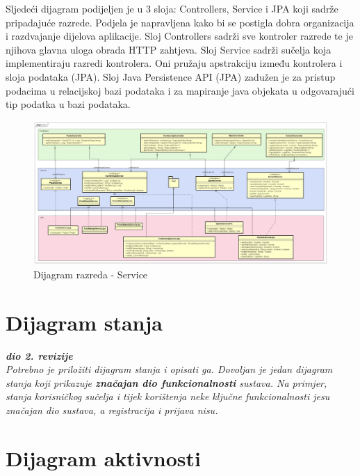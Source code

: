 		\newpage
		Sljedeći dijagram podijeljen je u 3 sloja: Controllers, Service i JPA koji sadrže pripadajuće razrede. Podjela je napravljena kako bi se postigla dobra organizacija i razdvajanje dijelova aplikacije. Sloj Controllers sadrži sve kontroler razrede te je njihova glavna uloga obrada HTTP zahtjeva. Sloj Service sadrži sučelja koja implementiraju razredi kontrolera. Oni pružaju apstrakciju između kontrolera i sloja podataka (JPA). Sloj Java Persistence API (JPA) zadužen je za pristup podacima u relacijskoj bazi podataka i za mapiranje java objekata u odgovarajući tip podatka u bazi podataka.
		\begin{figure}[H]
			\includegraphics[width=\textwidth]{slike/serviceClassDiagram.PNG} %
			\caption{Dijagram razreda - Service}
			\label{fig:dr-service} %
		\end{figure}
			\eject

		\section{Dijagram stanja}


			\textbf{\textit{dio 2. revizije}}\\

			\textit{Potrebno je priložiti dijagram stanja i opisati ga. Dovoljan je jedan dijagram stanja koji prikazuje \textbf{značajan dio funkcionalnosti} sustava. Na primjer, stanja korisničkog sučelja i tijek korištenja neke ključne funkcionalnosti jesu značajan dio sustava, a registracija i prijava nisu. }


			\eject

		\section{Dijagram aktivnosti}

